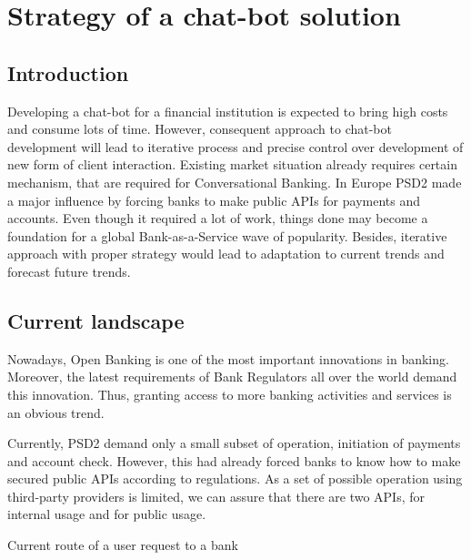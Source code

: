 
\section{Strategy of a chat-bot solution}

\subsection*{Introduction}
Developing a chat-bot for a financial institution is expected to bring high costs and consume lots of time.
However, consequent approach to chat-bot development will lead to iterative process and precise control over development of new form of client interaction.
Existing market situation already requires certain mechanism, that are required for Conversational Banking.
In Europe PSD2 made a major influence by forcing banks to make public APIs for payments and accounts.
Even though it required a lot of work, things done may become a foundation for a global Bank-as-a-Service wave of popularity.
Besides, iterative approach with proper strategy would lead to adaptation to current trends and forecast future trends.

\subsection{Current landscape}

Nowadays, Open Banking is one of the most important innovations in banking.
Moreover, the latest requirements of Bank Regulators all over the world demand this innovation. 
Thus, granting access to more banking activities and services is an obvious trend.

Currently, PSD2 demand only a small subset of operation, initiation of payments and account check.
However, this had already forced banks to know how to make secured public APIs according to regulations.
As a set of possible operation using third-party providers is limited, we can assure that there are two APIs, for internal usage and for public usage.

\begin{table}
    \centering
    \caption{Current route of a user request to a bank}
    \medskip
\end{table}

